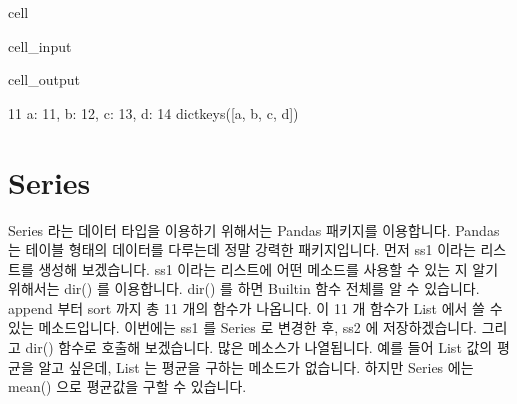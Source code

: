 \documentclass[letterpaper,10pt,english]{jupyterBook}
\begin{document}
\begin{sphinxuseclass}{cell}\begin{sphinxVerbatimInput}

\begin{sphinxuseclass}{cell_input}
\begin{sphinxVerbatim}[commandchars=\\\{\}]
    
\PYG{p}{[}\PYG{p}{]}

\PYG{p}{[}\PYG{p}{]}  

\end{sphinxVerbatim}

\end{sphinxuseclass}\end{sphinxVerbatimInput}
\begin{sphinxVerbatimOutput}

\begin{sphinxuseclass}{cell_output}
\begin{sphinxVerbatim}[commandchars=\\\{\}]
11
\PYGZob{}\PYGZsq{}a\PYGZsq{}: 11, \PYGZsq{}b\PYGZsq{}: 12, \PYGZsq{}c\PYGZsq{}: 13, \PYGZsq{}d\PYGZsq{}: 14\PYGZcb{}
dict\PYGZus{}keys([\PYGZsq{}a\PYGZsq{}, \PYGZsq{}b\PYGZsq{}, \PYGZsq{}c\PYGZsq{}, \PYGZsq{}d\PYGZsq{}])
\end{sphinxVerbatim}

\end{sphinxuseclass}\end{sphinxVerbatimOutput}

\end{sphinxuseclass}

\section{Series}
\label{\detokenize{chapter2/2.1.1_Python_Basics:series}}
\sphinxAtStartPar
Series 라는 데이터 타입을 이용하기 위해서는 Pandas 패키지를 이용합니다. Pandas 는 테이블 형태의 데이터를 다루는데 정말 강력한 패키지입니다. 먼저 ss1 이라는 리스트를 생성해 보겠습니다. ss1 이라는 리스트에 어떤 메소드를 사용할 수 있는 지 알기 위해서는 dir() 를 이용합니다.  dir() 를 하면 Built\sphinxhyphen{}in 함수 전체를 알 수 있습니다. append 부터 sort 까지 총 11 개의 함수가 나옵니다. 이 11 개 함수가 List 에서 쓸 수 있는 메소드입니다. 이번에는 ss1 를 Series 로 변경한 후, ss2 에 저장하겠습니다. 그리고 dir() 함수로 호출해 보겠습니다. 많은 메소스가 나열됩니다. 예를 들어 List 값의 평균을 알고 싶은데, List 는 평균을 구하는 메소드가 없습니다. 하지만 Series 에는 mean() 으로 평균값을 구할 수 있습니다.
\end{document}
